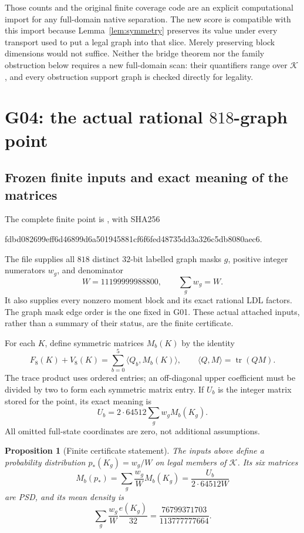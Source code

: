 \documentclass[11pt]{article}
\newtheorem{proposition}[theorem]{Proposition}
\newcommand{\tr}{\operatorname{tr}}
\newcommand{\file}[1]{\texttt{\detokenize{#1}}}
\begin{document}
Those counts and the original finite coverage code are an explicit
computational import for any full-domain native separation.  The new
score is compatible with this import because
Lemma~\ref{lem:symmetry} preserves its value under every transport used
to put a legal graph into that slice.  Merely preserving block
dimensions would not suffice.  Neither the bridge theorem nor the
family obstruction below requires a new full-domain scan: their
quantifiers range over \(\mathcal K\), and every obstruction support
graph is checked directly for legality.

\section{G04: the actual rational \(818\)-graph point}

\subsection{Frozen finite inputs and exact meaning of the matrices}

The complete finite point is \file{FAMILY_OBSTRUCTION.json}, with SHA256
\begin{center}\scriptsize\ttfamily
fdbd082699eff6d46899d6a501945881cf6f6fed48735dd3a326c5db8080aec6.
\end{center}
The file supplies all \(818\) distinct \(32\)-bit labelled graph masks
\(g\), positive integer numerators \(w_g\), and denominator
\[
 W=11199999988800,\qquad \sum_gw_g=W.
 \tag{G04.1}
\]
It also supplies every nonzero moment block and its exact rational
LDL factors.  The graph mask edge order is the one fixed in G01.
These actual attached inputs, rather than a summary of their status,
are the finite certificate.

For each \(K\), define symmetric matrices \(M_b(K)\) by the identity
\[
 F_8(K)+V_8(K)=\sum_{b=0}^5\langle Q_b,M_b(K)\rangle,
 \qquad \langle Q,M\rangle=\tr(QM).
 \tag{G04.2}
\]
The trace product uses ordered entries; an off-diagonal upper
coefficient must be divided by two to form each symmetric matrix
entry.  If \(U_b\) is the integer matrix stored for the point, its
exact meaning is
\[
 U_b=2\cdot64512\sum_g w_gM_b(K_g).
 \tag{G04.3}
\]
All omitted full-state coordinates are zero, not additional assumptions.

\begin{proposition}[Finite certificate statement]\label{prop:point}
The inputs above define a probability distribution \(p_*(K_g)=w_g/W\)
on legal members of \(\mathcal K\).  Its six matrices
\[
 M_b(p_*)=\sum_g\frac{w_g}{W}M_b(K_g)
         =\frac{U_b}{2\cdot64512W}
 \tag{G04.4}
\]
are PSD, and its mean density is
\[
 \sum_g\frac{w_g}{W}\frac{e(K_g)}{32}
 =\frac{76799371703}{113777777664}.
 \tag{G04.5}
\]
\end{proposition}
\end{document}
